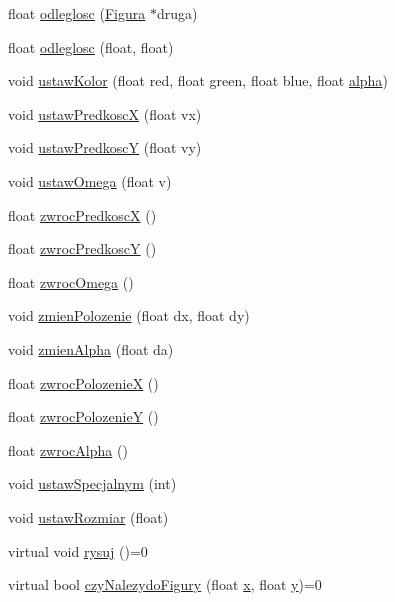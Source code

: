\begin{DoxyCompactItemize}
\item 
float \hyperlink{classFigura_a351dd41d348f9a2adaed7802c12722df}{odleglosc} (\hyperlink{classFigura}{Figura} $\ast$druga)
\item 
float \hyperlink{classFigura_a1b60d6f4763b92efa9cb4307aecea892}{odleglosc} (float, float)
\item 
void \hyperlink{classFigura_a08bbbedf4e27f5f17ba897ea6b1bf7a5}{ustaw\-Kolor} (float red, float green, float blue, float \hyperlink{classFigura_a601361fbb05bc4dc3b9cab1a868b2910}{alpha})
\item 
void \hyperlink{classFigura_a6e7a5f23810da2aa73f2ad28f8918d31}{ustaw\-Predkosc\-X} (float vx)
\item 
void \hyperlink{classFigura_a22ffec44b60184584f94e1fcd95bf5b5}{ustaw\-Predkosc\-Y} (float vy)
\item 
void \hyperlink{classFigura_a93bd750b3c4311f584fe2e1d899b470a}{ustaw\-Omega} (float v)
\item 
float \hyperlink{classFigura_a33b849c7f3a12e260ae6294f1120b4bd}{zwroc\-Predkosc\-X} ()
\item 
float \hyperlink{classFigura_a6d40d8f173b099d9e76d7a7ccc73a0cb}{zwroc\-Predkosc\-Y} ()
\item 
float \hyperlink{classFigura_a94da9ef8eb433270570abd5074dbd3fa}{zwroc\-Omega} ()
\item 
void \hyperlink{classFigura_a8eaf7fc68e05ce5a602ae741759e36e4}{zmien\-Polozenie} (float dx, float dy)
\item 
void \hyperlink{classFigura_ab017b5da886407a1a809f15ed9ab32f4}{zmien\-Alpha} (float da)
\item 
float \hyperlink{classFigura_a009283dfbe0ed4e538c6fc857c544f29}{zwroc\-Polozenie\-X} ()
\item 
float \hyperlink{classFigura_aba4eb260f9d5f7ff7a52e9eb8fc99f5c}{zwroc\-Polozenie\-Y} ()
\item 
float \hyperlink{classFigura_a3cfd45edd89e226a1fb44d8f4d3f7a56}{zwroc\-Alpha} ()
\item 
void \hyperlink{classFigura_aef7fbdf672096d76336a460bcfb3108a}{ustaw\-Specjalnym} (int)
\item 
void \hyperlink{classFigura_ac5df5b70874e675dc1463b8ddc68612b}{ustaw\-Rozmiar} (float)
\item 
virtual void \hyperlink{classFigura_a6ec035fbeb95129af6ca64d2adff7651}{rysuj} ()=0
\item 
virtual bool \hyperlink{classFigura_a14f9ba21828b6292488e1fa12bf1b85f}{czy\-Nalezydo\-Figury} (float \hyperlink{classFigura_ad640a05ebb1ddbf595124f0b31793e8a}{x}, float \hyperlink{classFigura_ab17e5953f2898eb729b2dc506640bce2}{y})=0

\end{DoxyCompactItemize}
